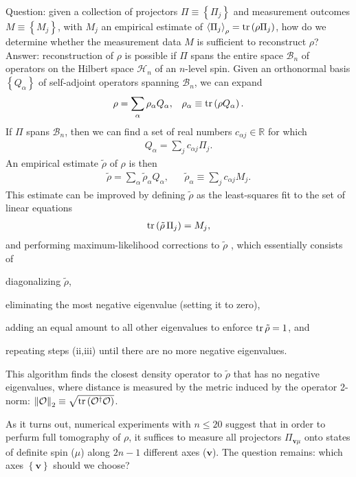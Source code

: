 \documentclass[nofootinbib,notitlepage,11pt]{revtex4-2}
\newcommand{\p}[1]{\left(#1\right)} %
\renewcommand{\set}[1]{\left\{#1\right\}} %
\newcommand{\bk}{\Braket} %
\renewcommand{\v}{\bm} %
\newcommand{\1}{\mathds{1}}
\newcommand{\B}{\mathcal{B}}
\renewcommand{\H}{\mathcal{H}}
\renewcommand{\O}{\mathcal{O}}
\newcommand{\RR}{\mathbb{R}}
\begin{document}
Question: given a collection of projectors $\Pi\equiv\set{\Pi_j}$ and measurement outcomes $M\equiv\set{M_j}$, with $M_j$ an empirical estimate of $\bk{\Pi_j}_\rho=\tr\p{\rho\Pi_j}$, how do we determine whether the measurement data $M$ is sufficient to reconstruct $\rho$?
Answer: reconstruction of $\rho$ is possible if $\Pi$ spans the entire space $\B_n$ of operators on the Hilbert space $\H_n$ of an $n$-level spin.
Given an orthonormal basis $\set{Q_\alpha}$ of self-adjoint operators spanning $\B_n$, we can expand
\begin{align}
  \rho = \sum_\alpha \rho_\alpha Q_\alpha,
  &&
  \rho_\alpha \equiv \tr\p{\rho Q_\alpha}.
\end{align}
If $\Pi$ spans $\B_n$, then we can find a set of real numbers $c_{\alpha j}\in\RR$ for which
\begin{align}
  Q_\alpha = \sum_j c_{\alpha j} \Pi_j.
\end{align}
An empirical estimate $\tilde\rho$ of $\rho$ is then
\begin{align}
  \tilde\rho = \sum_\alpha \tilde\rho_\alpha Q_\alpha,
  &&
  \tilde\rho_\alpha \equiv \sum_j c_{\alpha j} M_j.
\end{align}
This estimate can be improved by defining $\tilde\rho$ as the least-squares fit to the set of linear equations
\begin{align}
  \tr\p{\tilde\rho\,\Pi_j} = M_j,
\end{align}
and performing maximum-likelihood corrections to $\tilde\rho$ \cite{smolin2012efficient}, which essentially consists of
\begin{enumerate*}
\item diagonalizing $\tilde\rho$,
\item eliminating the most negative eigenvalue (setting it to zero),
\item adding an equal amount to all other eigenvalues to enforce $\tr\tilde\rho=1$, and
\item repeating steps (ii,iii) until there are no more negative eigenvalues.
\end{enumerate*}
This algorithm finds the closest density operator to $\tilde\rho$ that has no negative eigenvalues, where distance is measured by the metric induced by the operator 2-norm: $\norm{\O}_2\equiv\sqrt{\tr\p{\O^\dag \O}}$.

As it turns out, numerical experiments with $n\le20$ suggest that in order to perfurm full tomography of $\rho$, it suffices to measure all projectors $\Pi_{\v v\mu}$ onto states of definite spin ($\mu$) along $2n-1$ different axes ($\v v$).
The question remains: which axes $\set{\v v}$ should we choose?


\end{document}
